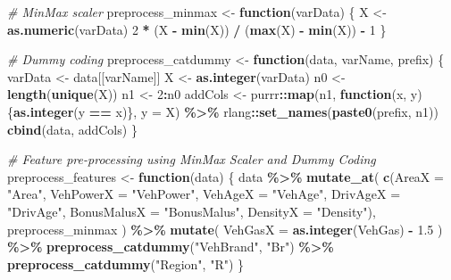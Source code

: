 \documentclass[
]{article}
\newenvironment{Shaded}{\begin{snugshade}}{\end{snugshade}}
\newcommand{\AttributeTok}[1]{\textcolor[rgb]{0.13,0.29,0.53}{#1}}
\newcommand{\CommentTok}[1]{\textcolor[rgb]{0.56,0.35,0.01}{\textit{#1}}}
\newcommand{\ControlFlowTok}[1]{\textcolor[rgb]{0.13,0.29,0.53}{\textbf{#1}}}
\newcommand{\DecValTok}[1]{\textcolor[rgb]{0.00,0.00,0.81}{#1}}
\newcommand{\FloatTok}[1]{\textcolor[rgb]{0.00,0.00,0.81}{#1}}
\newcommand{\FunctionTok}[1]{\textcolor[rgb]{0.13,0.29,0.53}{\textbf{#1}}}
\newcommand{\NormalTok}[1]{#1}
\newcommand{\OtherTok}[1]{\textcolor[rgb]{0.56,0.35,0.01}{#1}}
\newcommand{\SpecialCharTok}[1]{\textcolor[rgb]{0.81,0.36,0.00}{\textbf{#1}}}
\newcommand{\StringTok}[1]{\textcolor[rgb]{0.31,0.60,0.02}{#1}}
\begin{document}
\begin{Shaded}
\begin{Highlighting}[]
\CommentTok{\# MinMax scaler}
\NormalTok{preprocess\_minmax }\OtherTok{\textless{}{-}} \ControlFlowTok{function}\NormalTok{(varData) \{}
\NormalTok{  X }\OtherTok{\textless{}{-}} \FunctionTok{as.numeric}\NormalTok{(varData)}
  \DecValTok{2} \SpecialCharTok{*}\NormalTok{ (X }\SpecialCharTok{{-}} \FunctionTok{min}\NormalTok{(X)) }\SpecialCharTok{/}\NormalTok{ (}\FunctionTok{max}\NormalTok{(X) }\SpecialCharTok{{-}} \FunctionTok{min}\NormalTok{(X)) }\SpecialCharTok{{-}} \DecValTok{1}
\NormalTok{\}}

\CommentTok{\# Dummy coding }
\NormalTok{preprocess\_catdummy }\OtherTok{\textless{}{-}} \ControlFlowTok{function}\NormalTok{(data, varName, prefix) \{}
\NormalTok{  varData }\OtherTok{\textless{}{-}}\NormalTok{ data[[varName]]}
\NormalTok{  X }\OtherTok{\textless{}{-}} \FunctionTok{as.integer}\NormalTok{(varData)}
\NormalTok{  n0 }\OtherTok{\textless{}{-}} \FunctionTok{length}\NormalTok{(}\FunctionTok{unique}\NormalTok{(X))}
\NormalTok{  n1 }\OtherTok{\textless{}{-}} \DecValTok{2}\SpecialCharTok{:}\NormalTok{n0}
\NormalTok{  addCols }\OtherTok{\textless{}{-}}\NormalTok{ purrr}\SpecialCharTok{::}\FunctionTok{map}\NormalTok{(n1, }\ControlFlowTok{function}\NormalTok{(x, y) \{}\FunctionTok{as.integer}\NormalTok{(y }\SpecialCharTok{==}\NormalTok{ x)\}, }\AttributeTok{y =}\NormalTok{ X) }\SpecialCharTok{\%\textgreater{}\%}
\NormalTok{    rlang}\SpecialCharTok{::}\FunctionTok{set\_names}\NormalTok{(}\FunctionTok{paste0}\NormalTok{(prefix, n1))}
  \FunctionTok{cbind}\NormalTok{(data, addCols)}
\NormalTok{\}}

\CommentTok{\# Feature pre{-}processing using MinMax Scaler and Dummy Coding}
\NormalTok{preprocess\_features }\OtherTok{\textless{}{-}} \ControlFlowTok{function}\NormalTok{(data) \{}
\NormalTok{  data }\SpecialCharTok{\%\textgreater{}\%}
    \FunctionTok{mutate\_at}\NormalTok{(}
      \FunctionTok{c}\NormalTok{(}\AttributeTok{AreaX =} \StringTok{"Area"}\NormalTok{, }\AttributeTok{VehPowerX =} \StringTok{"VehPower"}\NormalTok{, }\AttributeTok{VehAgeX =} \StringTok{"VehAge"}\NormalTok{,}
        \AttributeTok{DrivAgeX =} \StringTok{"DrivAge"}\NormalTok{, }\AttributeTok{BonusMalusX =} \StringTok{"BonusMalus"}\NormalTok{, }\AttributeTok{DensityX =} \StringTok{"Density"}\NormalTok{),}
\NormalTok{      preprocess\_minmax}
\NormalTok{    ) }\SpecialCharTok{\%\textgreater{}\%}
    \FunctionTok{mutate}\NormalTok{(}
      \AttributeTok{VehGasX =} \FunctionTok{as.integer}\NormalTok{(VehGas) }\SpecialCharTok{{-}} \FloatTok{1.5}
\NormalTok{    ) }\SpecialCharTok{\%\textgreater{}\%}
    \FunctionTok{preprocess\_catdummy}\NormalTok{(}\StringTok{"VehBrand"}\NormalTok{, }\StringTok{"Br"}\NormalTok{) }\SpecialCharTok{\%\textgreater{}\%}
    \FunctionTok{preprocess\_catdummy}\NormalTok{(}\StringTok{"Region"}\NormalTok{, }\StringTok{"R"}\NormalTok{)}
\NormalTok{\}}
\end{Highlighting}
\end{Shaded}
\end{document}
